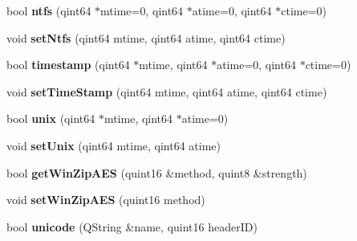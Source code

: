 \begin{DoxyCompactItemize}
\item 
bool {\bfseries ntfs} (qint64 $\ast$mtime=0, qint64 $\ast$atime=0, qint64 $\ast$ctime=0)\hypertarget{class_extra_fields_a9ad227cf0242111ec3cf83dbd529a3f9}{}\label{class_extra_fields_a9ad227cf0242111ec3cf83dbd529a3f9}

\item 
void {\bfseries set\+Ntfs} (qint64 mtime, qint64 atime, qint64 ctime)\hypertarget{class_extra_fields_a8aa4efde33082052f1b72e24f7f28373}{}\label{class_extra_fields_a8aa4efde33082052f1b72e24f7f28373}

\item 
bool {\bfseries timestamp} (qint64 $\ast$mtime, qint64 $\ast$atime=0, qint64 $\ast$ctime=0)\hypertarget{class_extra_fields_a8282fae53282379c57c4a728c91debe8}{}\label{class_extra_fields_a8282fae53282379c57c4a728c91debe8}

\item 
void {\bfseries set\+Time\+Stamp} (qint64 mtime, qint64 atime, qint64 ctime)\hypertarget{class_extra_fields_a50b151989f6bd39f75f70cc766958a7b}{}\label{class_extra_fields_a50b151989f6bd39f75f70cc766958a7b}

\item 
bool {\bfseries unix} (qint64 $\ast$mtime, qint64 $\ast$atime=0)\hypertarget{class_extra_fields_a37c4de1bd7d3c4a162b935c91636d907}{}\label{class_extra_fields_a37c4de1bd7d3c4a162b935c91636d907}

\item 
void {\bfseries set\+Unix} (qint64 mtime, qint64 atime)\hypertarget{class_extra_fields_a040c6b4ac71ee443a0ff3f3e42fd6856}{}\label{class_extra_fields_a040c6b4ac71ee443a0ff3f3e42fd6856}

\item 
bool {\bfseries get\+Win\+Zip\+A\+ES} (quint16 \&method, quint8 \&strength)\hypertarget{class_extra_fields_a5bad9761cc868f6308dd94c5d964bd6c}{}\label{class_extra_fields_a5bad9761cc868f6308dd94c5d964bd6c}

\item 
void {\bfseries set\+Win\+Zip\+A\+ES} (quint16 method)\hypertarget{class_extra_fields_aedb7c21caa58ae04b52bf3c1573285a8}{}\label{class_extra_fields_aedb7c21caa58ae04b52bf3c1573285a8}

\item 
bool {\bfseries unicode} (Q\+String \&name, quint16 header\+ID)\hypertarget{class_extra_fields_aea83aaa7e5853d0d1d831f73d24978e1}{}\label{class_extra_fields_aea83aaa7e5853d0d1d831f73d24978e1}

\end{DoxyCompactItemize}
